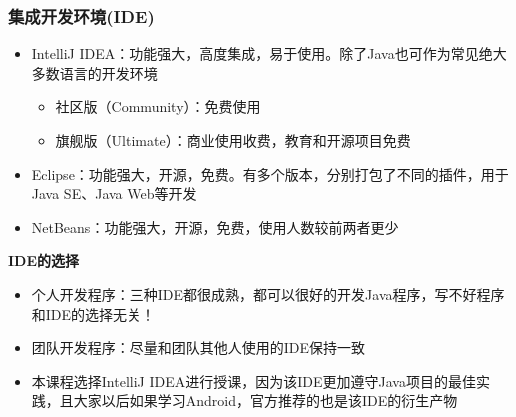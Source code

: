 \begin{frame}
  \frametitle{集成开发环境(IDE)}
  \begin{itemize}
    \item IntelliJ IDEA：功能强大，高度集成，易于使用。除了Java也可作为常见绝大多数语言的开发环境
      \begin{itemize}
        \item 社区版（Community）：免费使用
        \item 旗舰版（Ultimate）：商业使用收费，教育和开源项目免费
      \end{itemize}
    \item Eclipse：功能强大，开源，免费。有多个版本，分别打包了不同的插件，用于Java SE、Java Web等开发
    \item NetBeans：功能强大，开源，免费，使用人数较前两者更少
  \end{itemize}
  
  \begin{block}{\textbf{IDE的选择}}
	\begin{itemize}
		\item 个人开发程序：三种IDE都很成熟，都可以很好的开发Java程序，写不好程序和IDE的选择无关！
		\item 团队开发程序：尽量和团队其他人使用的IDE保持一致
		\item 本课程选择IntelliJ IDEA进行授课，因为该IDE更加遵守Java项目的最佳实践，且大家以后如果学习Android，官方推荐的也是该IDE的衍生产物
	\end{itemize}
  \end{block}

\end{frame}
